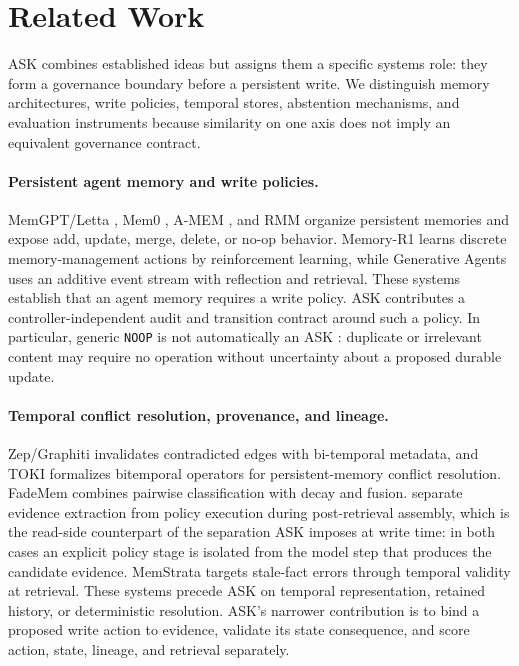 \section{Related Work}
\label{sec:related}

ASK combines established ideas but assigns them a specific systems role: they
form a governance boundary before a persistent write. We distinguish memory
architectures, write policies, temporal stores, abstention mechanisms, and
evaluation instruments because similarity on one axis does not imply an
equivalent governance contract.

\paragraph{Persistent agent memory and write policies.}
MemGPT/Letta \citep{packer2023memgpt}, Mem0 \citep{chhikara2025mem0}, A-MEM
\citep{xu2025amem}, and RMM \citep{tan2025rmm} organize persistent memories and
expose add, update, merge, delete, or no-op behavior. Memory-R1
\citep{yan2025memoryr1} learns discrete memory-management actions by
reinforcement learning, while Generative Agents \citep{park2023generative}
uses an additive event stream with reflection and retrieval. These systems
establish that an agent memory requires a write policy. ASK contributes a
controller-independent audit and transition contract around such a policy. In
particular, generic \texttt{NOOP} is not automatically an ASK \abstain:
duplicate or irrelevant content may require no operation without uncertainty
about a proposed durable update.

\paragraph{Temporal conflict resolution, provenance, and lineage.}
Zep/Graphiti \citep{rasmussen2025zep} invalidates contradicted edges with
bi-temporal metadata, and TOKI \citep{wang2026toki} formalizes bitemporal
operators for persistent-memory conflict resolution. FadeMem
\citep{fademem2026} combines pairwise classification with decay and fusion.
\citet{reddy2026deterministic} separate evidence extraction from policy execution
during post-retrieval assembly, which is the read-side counterpart of the
separation ASK imposes at write time: in both cases an explicit policy stage is
isolated from the model step that produces the candidate evidence.
MemStrata \citep{yadav2026memstrata} targets
stale-fact errors through temporal validity at retrieval. These systems precede
ASK on temporal representation, retained history, or deterministic resolution.
ASK's narrower contribution is to bind a proposed write action to evidence,
validate its state consequence, and score action, state, lineage, and retrieval
separately.

